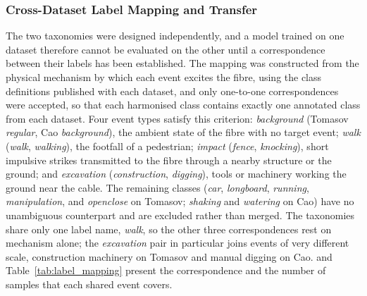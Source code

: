 \subsubsection{Cross-Dataset Label Mapping and Transfer}
\label{sec:chap3Mapping}
The two taxonomies were designed independently, and a model trained on one dataset therefore cannot be evaluated on the other until a correspondence between their labels has been established. The mapping was constructed from the physical mechanism by which each event excites the fibre, using the class definitions published with each dataset, and only one-to-one correspondences were accepted, so that each harmonised class contains exactly one annotated class from each dataset. Four event types satisfy this criterion: \emph{background} (Tomasov \emph{regular}, Cao \emph{background}), the ambient state of the fibre with no target event; \emph{walk} (\emph{walk}, \emph{walking}), the footfall of a pedestrian; \emph{impact} (\emph{fence}, \emph{knocking}), short impulsive strikes transmitted to the fibre through a nearby structure or the ground; and \emph{excavation} (\emph{construction}, \emph{digging}), tools or machinery working the ground near the cable. The remaining classes (\emph{car}, \emph{longboard}, \emph{running}, \emph{manipulation}, and \emph{openclose} on Tomasov; \emph{shaking} and \emph{watering} on Cao) have no unambiguous counterpart and are excluded rather than merged. The taxonomies share only one label name, \emph{walk}, so the other three correspondences rest on mechanism alone; the \emph{excavation} pair in particular joins events of very different scale, construction machinery on Tomasov and manual digging on Cao.  and Table~\ref{tab:label_mapping} present the correspondence and the number of samples that each shared event covers.

